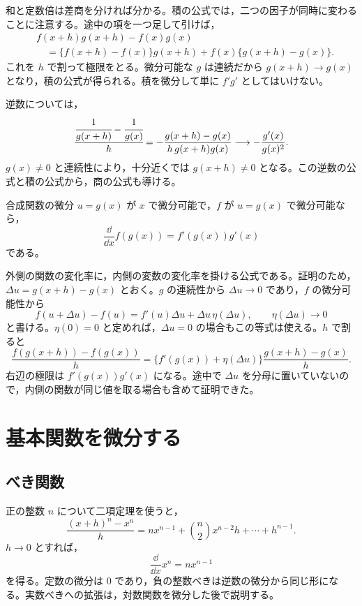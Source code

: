 和と定数倍は差商を分ければ分かる。積の公式では，二つの因子が同時に変わることに注意する。途中の項を一つ足して引けば，
\begin{align*}
 &f(x+h)g(x+h)-f(x)g(x)\\
 &\quad=\{f(x+h)-f(x)\}g(x+h)
       +f(x)\{g(x+h)-g(x)\}.
\end{align*}
これを $h$ で割って極限をとる。微分可能な $g$ は連続だから $g(x+h)\to g(x)$ となり，積の公式が得られる。積を微分して単に $f'g'$ としてはいけない。

逆数については，
\[
 \cfrac{\cfrac1{g(x+h)}-\cfrac1{g(x)}}h
 =-\frac{g(x+h)-g(x)}{h\,g(x+h)g(x)}
 \longrightarrow-\frac{g'(x)}{g(x)^2}.
\]
$g(x)\ne0$ と連続性により，十分近くでは $g(x+h)\ne0$ となる。この逆数の公式と積の公式から，商の公式も導ける。

\begin{theorem}{合成関数の微分}\label{定理:合成微分}
$u=g(x)$ が $x$ で微分可能で，$f$ が $u=g(x)$ で微分可能なら，
\[
 \frac{\dd}{\dd x}f(g(x))=f'(g(x))g'(x)
\]
である。
\end{theorem}

外側の関数の変化率に，内側の変数の変化率を掛ける公式である。証明のため，$\Delta u=g(x+h)-g(x)$ とおく。$g$ の連続性から $\Delta u\to0$ であり，$f$ の微分可能性から
\[
 f(u+\Delta u)-f(u)=f'(u)\Delta u+\Delta u\,\eta(\Delta u),
 \qquad \eta(\Delta u)\to0
\]
と書ける。$\eta(0)=0$ と定めれば，$\Delta u=0$ の場合もこの等式は使える。$h$ で割ると
\[
 \frac{f(g(x+h))-f(g(x))}h
 =\{f'(g(x))+\eta(\Delta u)\}
   \frac{g(x+h)-g(x)}h.
\]
右辺の極限は $f'(g(x))g'(x)$ になる。途中で $\Delta u$ を分母に置いていないので，内側の関数が同じ値を取る場合も含めて証明できた。

\section{基本関数を微分する}\label{節:基本微分}
\subsection{べき関数}
正の整数 $n$ について二項定理を使うと，
\[
 \frac{(x+h)^n-x^n}{h}
 =nx^{n-1}+\binom n2x^{n-2}h+\cdots+h^{n-1}.
\]
$h\to0$ とすれば，
\[
 \frac{\dd}{\dd x}x^n=nx^{n-1}
\]
を得る。定数の微分は $0$ であり，負の整数べきは逆数の微分から同じ形になる。実数べきへの拡張は，対数関数を微分した後で説明する。

